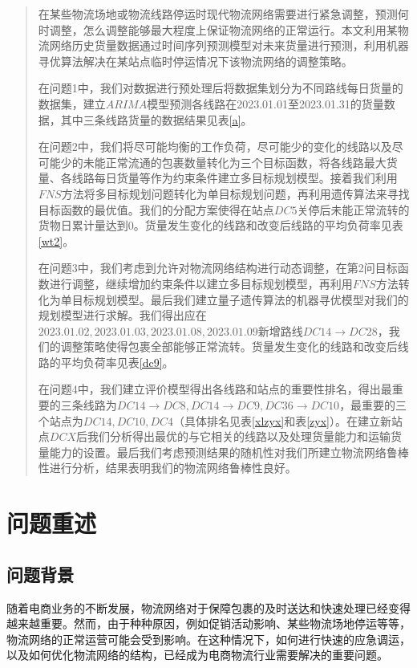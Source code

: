 \documentclass{MathorCupmodeling}
\begin{document}
	\begin{abstract}
在某些物流场地或物流线路停运时现代物流网络需要进行紧急调整，预测何时调整，怎么调整能够最大程度上保证物流网络的正常运行。本文利用某物流网络历史货量数据通过时间序列预测模型对未来货量进行预测，利用机器寻优算法解决在某站点临时停运情况下该物流网络的调整策略。

在问题1中，我们对数据进行预处理后将数据集划分为不同路线每日货量的数据集，建立$ARIMA$模型预测各线路在2023.01.01至2023.01.31的货量数据，其中三条线路货量的数据结果见表\ref{a}。

在问题2中，我们将尽可能均衡的工作负荷，尽可能少的变化的线路以及尽可能少的未能正常流通的包裹数量转化为三个目标函数，将各线路最大货量、各线路每日货量等作为约束条件建立多目标规划模型。接着我们利用$FNS$方法将多目标规划问题转化为单目标规划问题，再利用遗传算法来寻找目标函数的最优值。我们的分配方案使得在站点$DC5$关停后未能正常流转的货物日累计量达到0。货量发生变化的线路和改变后线路的平均负荷率见表\ref{wt2}。

在问题3中，我们考虑到允许对物流网络结构进行动态调整，在第2问目标函数进行调整，继续增加约束条件以建立多目标规划模型，再利用$FNS$方法转化为单目标规划模型。最后我们建立量子遗传算法的机器寻优模型对我们的规划模型进行求解。我们得出应在$2023.01.02,2023.01.03,2023.01.08,2023.01.09$新增路线$DC14\to DC28$，我们的调整策略使得包裹全部能够正常流转。货量发生变化的线路和改变后线路的平均负荷率见表\ref{dc9}。

在问题4中，我们建立评价模型得出各线路和站点的重要性排名，得出最重要的三条线路为$DC14\to DC8,DC14\to DC9,DC36\to DC10$，最重要的三个站点为$DC14,DC10,DC4$（具体排名见表\ref{xlzyx}和表\ref{zyx}）。在建立新站点$DCX$后我们分析得出最优的与它相关的线路以及处理货量能力和运输货量能力的设置。最后我们考虑预测结果的随机性对我们所建立物流网络鲁棒性进行分析，结果表明我们的物流网络鲁棒性良好。
	\end{abstract}
	\tableofcontents\newpage
	\section{问题重述}

\subsection{问题背景}
随着电商业务的不断发展，物流网络对于保障包裹的及时送达和快速处理已经变得越来越重要。然而，由于种种原因，例如促销活动影响、某些物流场地停运等等，物流网络的正常运营可能会受到影响。在这种情况下，如何进行快速的应急调运，以及如何优化物流网络的结构，已经成为电商物流行业需要解决的重要问题。
\end{document}
